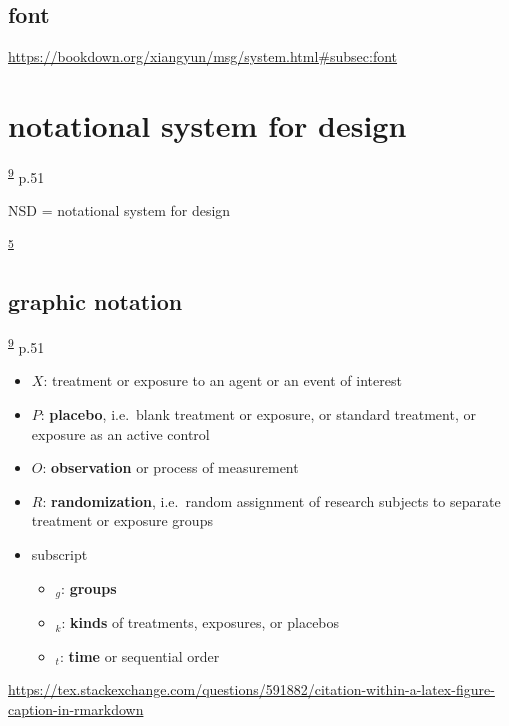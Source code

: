 \documentclass[
]{book}
\providecommand{\tightlist}{%
  \setlength{\itemsep}{0pt}\setlength{\parskip}{0pt}}
\theoremstyle{definition}
\theoremstyle{definition}
\theoremstyle{definition}
\theoremstyle{definition}
\theoremstyle{remark}
\begin{document}
\hypertarget{font}{%
\section{font}\label{font}}

\url{https://bookdown.org/xiangyun/msg/system.html\#subsec:font}

\hypertarget{notational-system-for-design}{%
\chapter{notational system for design}\label{notational-system-for-design}}

\textsuperscript{\protect\hyperlink{ref-hu2022}{9}} p.51

NSD = notational system for design

\textsuperscript{\protect\hyperlink{ref-campbell1963}{5}}

\hypertarget{graphic-notation}{%
\section{graphic notation}\label{graphic-notation}}

\textsuperscript{\protect\hyperlink{ref-hu2022}{9}} p.51

\begin{itemize}
\tightlist
\item
  \(X\): treatment or exposure to an agent or an event of interest
\item
  \(P\): \textbf{placebo}, i.e.~blank treatment or exposure, or standard treatment, or exposure as an active control
\item
  \(O\): \textbf{observation} or process of measurement
\item
  \(R\): \textbf{randomization}, i.e.~random assignment of research subjects to separate treatment or exposure groups
\item
  subscript

  \begin{itemize}
  \tightlist
  \item
    \(_g\): \textbf{groups}
  \item
    \(_k\): \textbf{kinds} of treatments, exposures, or placebos
  \item
    \(_t\): \textbf{time} or sequential order
  \end{itemize}
\end{itemize}

\url{https://tex.stackexchange.com/questions/591882/citation-within-a-latex-figure-caption-in-rmarkdown}
\end{document}
